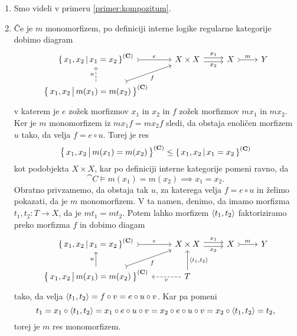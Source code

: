 \documentclass[../kategoricna_logika.tex]{subfiles}
\begin{document}
\begin{dokaz}
  \begin{enumerate}[label=(\roman*)]
    \item Smo videli v primeru \ref{primer:kompozitum}.

    \item Če je $m$ monomorfizem, po definiciji interne logike regularne kategorije dobimo diagram
      \begin{equation*}
      \begin{tikzcd}
        \setb{x_1,x_2}{x_1 = x_2}^{(\cat{C})} \ar[r, tail, "e"] & X \times X \ar[r, shift left, "x_1"] \ar[r, shift right, "x_2"'] & X \ar[r, tail, "m"] & Y \\
        \setb{x_1,x_2}{m(x_1) = m(x_2)}^{(\cat{C})} \ar[ur, tail, "f"'] \ar[u, dashed, "u"]
      \end{tikzcd}
      \end{equation*}
      v katerem je $e$ zožek morfizmov $x_1$ in $x_2$ in $f$ zožek morfizmov $m x_1$ in $m x_2$.
      Ker je $m$ monomorfizem iz $m x_1 f = m x_2 f$ sledi, da obstaja enoličen morfizem $u$ tako,
      da velja $f = e \circ u$. Torej je res
      $$\left\lbrace\, x_1,x_2 \,\middle|\, m(x_1) = m(x_2) \,\right\rbrace^{({\operatorname{\mathbf{C}}})} \leq \left\lbrace\, x_1,x_2 \,\middle|\, x_1 = x_2 \,\right\rbrace^{({\operatorname{\mathbf{C}}})}$$
      kot podobjekta $X \times X$, kar po definiciji interne kategorije pomeni ravno, da
      \[\cat{C} \models m(x_1) = m(x_2) \implies x_1 = x_2.\]
      Obratno privzamemo, da obstaja tak $u$, za katerega velja $f = e \circ u$ in želimo pokazati, da je $m$ monomorfizem.
      V ta namen, denimo, da imamo morfizma $t_1, t_2 : T \to X$, da je $m t_1 = m t_2$.
      Potem lahko morfizem $\langle t_1, t_2 \rangle$ faktoriziramo preko morfizma $f$ in dobimo diagam
      \begin{equation*}
      \begin{tikzcd}
        \setb{x_1,x_2}{x_1 = x_2}^{(\cat{C})} \ar[r, tail, "e"] & X \times X \ar[r, shift left, "x_1"] \ar[r, shift right, "x_2"'] & X \ar[r, tail, "m"] & Y \\
        \setb{x_1,x_2}{m(x_1) = m(x_2)}^{(\cat{C})} \ar[ur, tail, "f"'] \ar[u, "u"] & T \ar[u, "\fprod{t_1, t_2}"'] \ar[l, dashed, "v"]
      \end{tikzcd}
      \end{equation*}
      tako, da velja $\langle t_1, t_2 \rangle = f \circ v = e \circ u \circ v$. Kar pa pomeni
      $$t_1 = x_1 \circ \langle t_1, t_2 \rangle = x_1 \circ e \circ u \circ v = x_2 \circ e \circ u \circ v = x_2 \circ \langle t_1, t_2 \rangle = t_2,$$
      torej je $m$ res monomorfizem.


\end{enumerate}
\end{dokaz}
\end{document}
